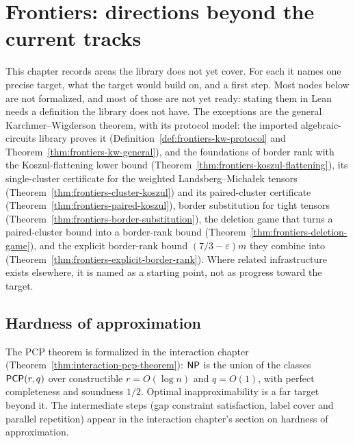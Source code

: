 \chapter{Frontiers: directions beyond the current tracks}
\label{chap:frontiers}

This chapter records areas the library does not yet cover. For each it names one
precise target, what the target would build on, and a first step. Most nodes
below are not formalized, and most of those are not yet ready: stating them in
Lean needs a definition the library does not have. The exceptions are the
general Karchmer--Wigderson theorem, with its protocol model: the imported
algebraic-circuits library proves it (Definition~\ref{def:frontiers-kw-protocol}
and Theorem~\ref{thm:frontiers-kw-general}), and the foundations of border rank
with the Koszul-flattening lower bound
(Theorem~\ref{thm:frontiers-koszul-flattening}), its single-cluster certificate for
the weighted Landsberg--Micha{\l}ek tensors (Theorem~\ref{thm:frontiers-cluster-koszul})
and its paired-cluster certificate (Theorem~\ref{thm:frontiers-paired-koszul}),
border substitution for tight tensors
(Theorem~\ref{thm:frontiers-border-substitution}), the deletion game that turns a
paired-cluster bound into a border-rank bound
(Theorem~\ref{thm:frontiers-deletion-game}), and the explicit border-rank bound
$(7/3 - \varepsilon)m$ they combine into
(Theorem~\ref{thm:frontiers-explicit-border-rank}). Where related infrastructure exists
elsewhere, it is named as a starting point, not as progress toward the target.

\section{Hardness of approximation}

The PCP theorem is formalized in the interaction chapter
(Theorem~\ref{thm:interaction-pcp-theorem}): $\mathsf{NP}$ is the union of the
classes $\mathsf{PCP}(r, q)$ over constructible $r = O(\log n)$ and $q = O(1)$,
with perfect completeness and soundness $1/2$. Optimal inapproximability is a
far target beyond it. The intermediate steps (gap constraint satisfaction,
label cover and parallel repetition) appear in the interaction chapter's
section on hardness of approximation.

